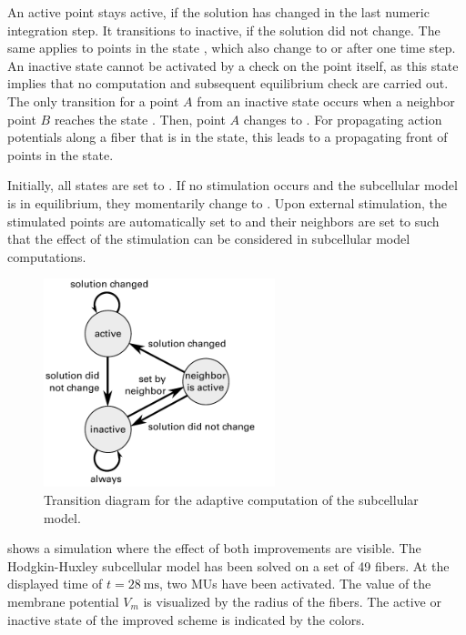 An active point stays active, if the solution has changed in the last numeric integration step. It transitions to inactive, if the solution did not change. The same applies to points in the state , which also change to  or  after one time step. 
An inactive state cannot be activated by a check on the point itself, as this state implies that no computation and subsequent equilibrium check are carried out. The only transition for a point $A$ from an inactive state occurs when a neighbor point $B$ reaches the state . Then, point $A$ changes to .
For propagating action potentials along a fiber that is in the  state, this leads to a propagating front of points in the  state.

Initially, all states are set to . If no stimulation occurs and the subcellular model is in equilibrium, they momentarily change to . Upon external stimulation, the stimulated points are automatically set to  and their neighbors are set to  such that the effect of the stimulation can be considered in subcellular model computations.

\begin{figure}%
  \centering%
  \includegraphics[width=0.6\textwidth]{images/implementation/state_chart.pdf}%
  \caption{Transition diagram for the adaptive computation of the subcellular model.}%
  \label{fig:state_chart}%
\end{figure}%

 shows a simulation where the effect of both improvements are visible. The Hodgkin-Huxley subcellular model has been solved on a set of 49 fibers. At the displayed time of $t=\SI{28}{\milli\second}$, two MUs have been activated. The value of the membrane potential $V_m$ is visualized by the radius of the fibers. The active or inactive state of the improved scheme is indicated by the colors.


